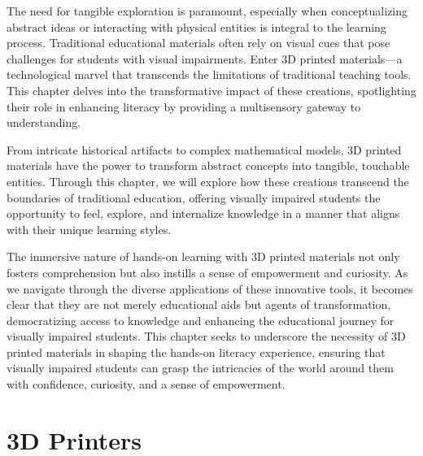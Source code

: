 \documentclass[14pt,letterpaper,twoside]{extreport}
\begin{document}
The need for tangible exploration is paramount, especially when conceptualizing abstract ideas or interacting with physical entities is integral to the learning process. Traditional educational materials often rely on visual cues that pose challenges for students with visual impairments. Enter 3D printed materials—a technological marvel that transcends the limitations of traditional teaching tools. This chapter delves into the transformative impact of these creations, spotlighting their role in enhancing literacy by providing a multisensory gateway to understanding.

From intricate historical artifacts to complex mathematical models, 3D printed materials have the power to transform abstract concepts into tangible, touchable entities. Through this chapter, we will explore how these creations transcend the boundaries of traditional education, offering visually impaired students the opportunity to feel, explore, and internalize knowledge in a manner that aligns with their unique learning styles.

The immersive nature of hands-on learning with 3D printed materials not only fosters comprehension but also instills a sense of empowerment and curiosity. As we navigate through the diverse applications of these innovative tools, it becomes clear that they are not merely educational aids but agents of transformation, democratizing access to knowledge and enhancing the educational journey for visually impaired students. This chapter seeks to underscore the necessity of 3D printed materials in shaping the hands-on literacy experience, ensuring that visually impaired students can grasp the intricacies of the world around them with confidence, curiosity, and a sense of empowerment.

\hypertarget{d-print-equipment}{%
	\section{3D Printers}\label{d-print-equipment}}
\end{document}
